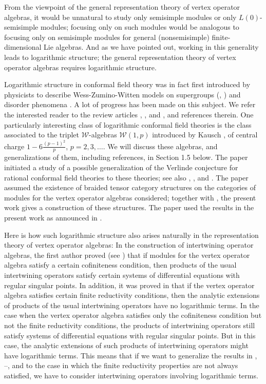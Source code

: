 \documentclass[12pt]{article}
\begin{document}
{}From the viewpoint of the general representation theory of vertex
operator algebras, it would be unnatural to study only semisimple
modules or only $L(0)$-semisimple modules; focusing only on such
modules would be analogous to focusing only on semisimple modules for
general (nonsemisimple) finite-dimensional Lie algebras.  And as we
have pointed out, working in this generality leads to logarithmic
structure; the general representation theory of vertex operator
algebras requires logarithmic structure.

Logarithmic structure in conformal field theory was in fact first
introduced by physicists to describe Wess-Zumino-Witten models on
supergroups (\cite{RoS}, \cite{SS}) and disorder phenomena \cite{Gu}.  A
lot of progress has been made on this subject.  We refer the
interested reader to the review articles \cite{Ga}, \cite{Fl2},
\cite{RT} and \cite{Fu}, and references therein.  One particularly
interesting class of logarithmic conformal field theories is the class
associated to the triplet $\mathcal{W}$-algebras 
$\mathcal{W}(1,p)$ introduced by Kausch \cite{K1}, of central charge
$1-6\frac{(p-1)^{2}}{p}$, $p=2,3,\dots$.  We will discuss these algebras, and
generalizations of them, including references, in Section 1.5
below.  The paper \cite{FHST} initiated a study of a possible
generalization of the Verlinde conjecture for rational conformal field
theories to these theories; see also \cite{FG}, \cite{FK},
\cite{GR2} and \cite{GT}.  The paper \cite{Fu}
assumed the existence of braided tensor category structures on the
categories of modules for the vertex operator algebras considered;
together with \cite{H13}, the present work gives a construction of
these structures. The paper \cite{CF} used the results in the present
work as announced in \cite{HLZ}.

Here is how such logarithmic structure also arises naturally in the
representation theory of vertex operator algebras: In the construction
of intertwining operator algebras, the first author proved (see
\cite{diff-eqn}) that if modules for the vertex operator algebra
satisfy a certain cofiniteness condition, then products of the usual
intertwining operators satisfy certain systems of differential
equations with regular singular points. In addition, it was proved in
\cite{diff-eqn} that if the vertex operator algebra satisfies certain
finite reductivity conditions, then the analytic extensions of
products of the usual intertwining operators have no logarithmic
terms.  In the case when the vertex operator algebra satisfies only
the cofiniteness condition but not the finite reductivity conditions,
the products of intertwining operators still satisfy systems of
differential equations with regular singular points.  But in this
case, the analytic extensions of such products of intertwining
operators might have logarithmic terms. This means that if we want to
generalize the results in \cite{tensorAnnounce},
\cite{tensorK}--\cite{tensor3}, \cite{tensor4} and \cite{diff-eqn} to
the case in which the finite reductivity properties are not always
satisfied, we have to consider intertwining operators involving
logarithmic terms.
\end{document}

